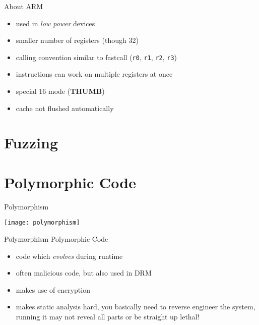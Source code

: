 \documentclass[beamer]{uibk}
\begin{document}
\begin{frame}{About ARM}
    \begin{itemize}
        \item used in \emph{low power} devices
        \item smaller number of registers (though \SI{32}{\bit})
        \item calling convention similar to fastcall (\texttt{r0}, \texttt{r1},
            \texttt{r2}, \texttt{r3})
        \item instructions can work on multiple registers at once
        \item special \SI{16}{\bit} mode (\textbf{THUMB})
        \item cache not flushed automatically
    \end{itemize}
\end{frame}

\section{Fuzzing}

\section{Polymorphic Code}

\begin{frame}{Polymorphism}
    \begin{center}
        \texttt{[image: polymorphism]}
    \end{center}
\end{frame}

\begin{frame}{\st{Polymorphism} Polymorphic Code}
    \begin{itemize}
        \item code which \emph{evolves} during runtime
        \item often malicious code, but also used in DRM
        \item makes use of encryption
        \medskip
        \pause
        \item makes static analysis hard, you basically need to reverse
            engineer the system,\\
            running it may not reveal all parts or be straight up lethal!
    \end{itemize}
\end{frame}
\end{document}
